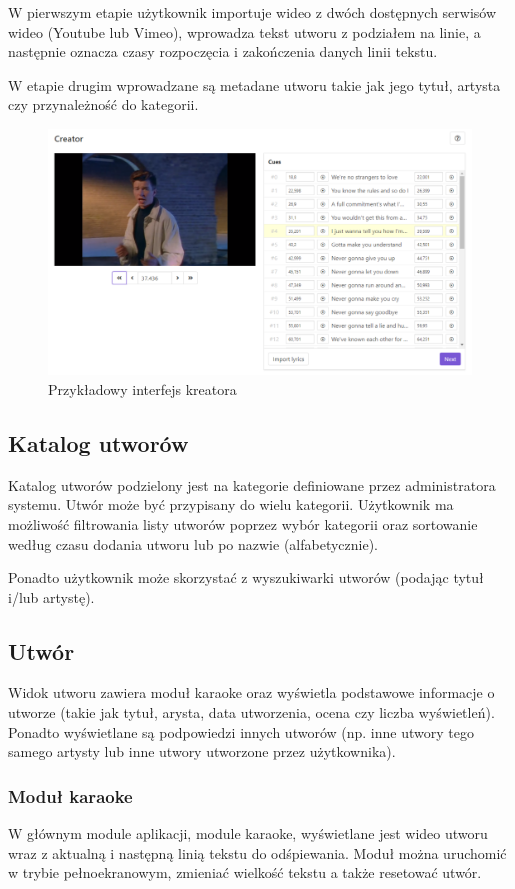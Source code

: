 \documentclass[11pt]{article}
\begin{document}
  W pierwszym etapie użytkownik importuje wideo z dwóch dostępnych serwisów wideo (Youtube lub Vimeo), wprowadza tekst utworu z podziałem na linie, a następnie oznacza czasy rozpoczęcia i zakończenia danych linii tekstu.

  W etapie drugim wprowadzane są metadane utworu takie jak jego tytuł, artysta czy przynależność do kategorii.

  \begin{figure}[ht]
    \centering
    \includegraphics[width=1.0\textwidth]{sample-creator.pdf}
    \caption{Przykładowy interfejs kreatora}
  \end{figure}

  \subsection{Katalog utworów}
  Katalog utworów podzielony jest na kategorie definiowane przez administratora systemu. Utwór może być przypisany do wielu kategorii. Użytkownik ma możliwość filtrowania listy utworów poprzez wybór kategorii oraz sortowanie według czasu dodania utworu lub po nazwie (alfabetycznie).

  Ponadto użytkownik może skorzystać z wyszukiwarki utworów (podając tytuł i/lub artystę).

  \subsection{Utwór}
  Widok utworu zawiera moduł karaoke oraz wyświetla podstawowe informacje o utworze (takie jak tytuł, arysta, data utworzenia, ocena czy liczba wyświetleń). Ponadto wyświetlane są podpowiedzi innych utworów (np. inne utwory tego samego artysty lub inne utwory utworzone przez użytkownika).

  \subsubsection{Moduł karaoke}
  W głównym module aplikacji, module karaoke, wyświetlane jest wideo utworu wraz z aktualną i następną linią tekstu do odśpiewania. Moduł można uruchomić w trybie pełnoekranowym, zmieniać wielkość tekstu a także resetować utwór.
\end{document}

